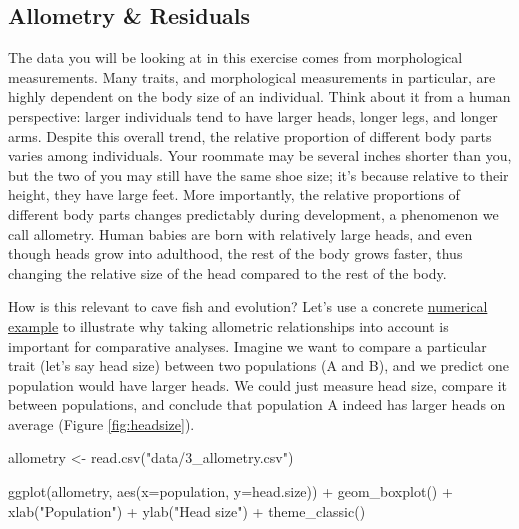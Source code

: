 \documentclass[
]{book}
\newenvironment{Shaded}{\begin{snugshade}}{\end{snugshade}}
\newcommand{\AttributeTok}[1]{\textcolor[rgb]{0.77,0.63,0.00}{#1}}
\newcommand{\FunctionTok}[1]{\textcolor[rgb]{0.00,0.00,0.00}{#1}}
\newcommand{\NormalTok}[1]{#1}
\newcommand{\OtherTok}[1]{\textcolor[rgb]{0.56,0.35,0.01}{#1}}
\newcommand{\SpecialCharTok}[1]{\textcolor[rgb]{0.00,0.00,0.00}{#1}}
\newcommand{\StringTok}[1]{\textcolor[rgb]{0.31,0.60,0.02}{#1}}
\begin{document}
\hypertarget{allometry-residuals}{%
\subsection{Allometry \& Residuals}\label{allometry-residuals}}

The data you will be looking at in this exercise comes from morphological measurements. Many traits, and morphological measurements in particular, are highly dependent on the body size of an individual. Think about it from a human perspective: larger individuals tend to have larger heads, longer legs, and longer arms. Despite this overall trend, the relative proportion of different body parts varies among individuals. Your roommate may be several inches shorter than you, but the two of you may still have the same shoe size; it's because relative to their height, they have large feet. More importantly, the relative proportions of different body parts changes predictably during development, a phenomenon we call allometry. Human babies are born with relatively large heads, and even though heads grow into adulthood, the rest of the body grows faster, thus changing the relative size of the head compared to the rest of the body.

How is this relevant to cave fish and evolution? Let's use a concrete \href{data/3_allometry.csv}{numerical example} to illustrate why taking allometric relationships into account is important for comparative analyses. Imagine we want to compare a particular trait (let's say head size) between two populations (A and B), and we predict one population would have larger heads. We could just measure head size, compare it between populations, and conclude that population A indeed has larger heads on average (Figure \ref{fig:headsize}).

\begin{Shaded}
\begin{Highlighting}[]
\NormalTok{allometry }\OtherTok{\textless{}{-}} \FunctionTok{read.csv}\NormalTok{(}\StringTok{"data/3\_allometry.csv"}\NormalTok{)}

\FunctionTok{ggplot}\NormalTok{(allometry, }\FunctionTok{aes}\NormalTok{(}\AttributeTok{x=}\NormalTok{population, }\AttributeTok{y=}\NormalTok{head.size)) }\SpecialCharTok{+}
    \FunctionTok{geom\_boxplot}\NormalTok{() }\SpecialCharTok{+}
    \FunctionTok{xlab}\NormalTok{(}\StringTok{"Population"}\NormalTok{) }\SpecialCharTok{+}
    \FunctionTok{ylab}\NormalTok{(}\StringTok{"Head size"}\NormalTok{) }\SpecialCharTok{+}
    \FunctionTok{theme\_classic}\NormalTok{()}
\end{Highlighting}
\end{Shaded}
\end{document}
